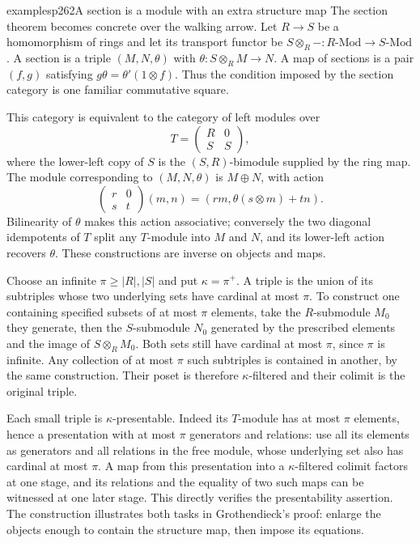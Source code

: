 \begin{dcomment}{examples}{p262}{A section is a module with an extra structure map}
The section theorem becomes concrete over the walking arrow. Let $R\to S$ be a homomorphism of rings and let its transport functor be $S\otimes_R-:R\text{-}\mathrm{Mod}\to S\text{-}\mathrm{Mod}$. A section is a triple $(M,N,\theta)$ with $\theta:S\otimes_RM\to N$. A map of sections is a pair $(f,g)$ satisfying $g\theta=\theta'(1\otimes f)$. Thus the condition imposed by the section category is one familiar commutative square.

This category is equivalent to the category of left modules over
\[
 T=\begin{pmatrix}R&0\\ S&S\end{pmatrix},
\]
where the lower-left copy of $S$ is the $(S,R)$-bimodule supplied by the ring map. The module corresponding to $(M,N,\theta)$ is $M\oplus N$, with action
\[
 \begin{pmatrix}r&0\\s&t\end{pmatrix}(m,n)
   =(rm,\theta(s\otimes m)+tn).
\]
Bilinearity of $\theta$ makes this action associative; conversely the two diagonal idempotents of $T$ split any $T$-module into $M$ and $N$, and its lower-left action recovers $\theta$. These constructions are inverse on objects and maps.

Choose an infinite $\pi\geq|R|,|S|$ and put $\kappa=\pi^+$. A triple is the union of its subtriples whose two underlying sets have cardinal at most $\pi$. To construct one containing specified subsets of at most $\pi$ elements, take the $R$-submodule $M_0$ they generate, then the $S$-submodule $N_0$ generated by the prescribed elements and the image of $S\otimes_RM_0$. Both sets still have cardinal at most $\pi$, since $\pi$ is infinite. Any collection of at most $\pi$ such subtriples is contained in another, by the same construction. Their poset is therefore $\kappa$-filtered and their colimit is the original triple.

Each small triple is $\kappa$-presentable. Indeed its $T$-module has at most $\pi$ elements, hence a presentation with at most $\pi$ generators and relations: use all its elements as generators and all relations in the free module, whose underlying set also has cardinal at most $\pi$. A map from this presentation into a $\kappa$-filtered colimit factors at one stage, and its relations and the equality of two such maps can be witnessed at one later stage. This directly verifies the presentability assertion. The construction illustrates both tasks in Grothendieck's proof: enlarge the objects enough to contain the structure map, then impose its equations.
\end{dcomment}

